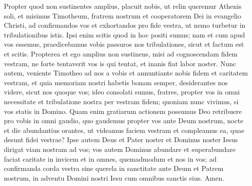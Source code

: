 \begin{biblechapter}
\begin{biblechapter}
\begin{biblechapter}
\verse Propter quod non sustinentes amplius, placuit nobis, ut relin queremur Athenis soli, 
\verse et misimus Timotheum, fratrem nostrum et cooperatorem Dei in evangelio Christi, ad confirmandos vos et exhortandos pro fide vestra, 
\verse ut nemo turbetur in tribulationibus istis. Ipsi enim scitis quod in hoc positi sumus; 
\verse nam et cum apud vos essemus, praedicebamus vobis passuros nos tribulationes, sicut et factum est et scitis. 
\verse Propterea et ego amplius non sustinens, misi ad cognoscendam fidem vestram, ne forte tentaverit vos is qui tentat, et inanis fiat labor noster.
 \verse Nunc autem, veniente Timotheo ad nos a vobis et annuntiante nobis fidem et caritatem vestram, et quia memoriam nostri habetis bonam semper, desiderantes nos videre, sicut nos quoque vos; 
\verse ideo consolati sumus, fratres, propter vos in omni necessitate et tribulatione nostra per vestram fidem; 
\verse quoniam nunc vivimus, si vos statis in Domino. 
\verse Quam enim gratiarum actionem possumus Deo retribuere pro vobis in omni gaudio, quo gaudemus propter vos ante Deum nostrum, 
\verse nocte et die abundantius orantes, ut videamus faciem vestram et compleamus ea, quae desunt fidei vestrae?
 \verse Ipse autem Deus et Pater noster et Dominus noster Iesus dirigat viam nostram ad vos; 
\verse vos autem Dominus abundare et superabundare faciat caritate in invicem et in omnes, quemadmodum et nos in vos; 
\verse ad confirmanda corda vestra sine querela in sanctitate ante Deum et Patrem nostrum, in adventu Domini nostri Iesu cum omnibus sanctis eius. Amen.
 

\end{biblechapter}
\end{biblechapter}
\end{biblechapter}
